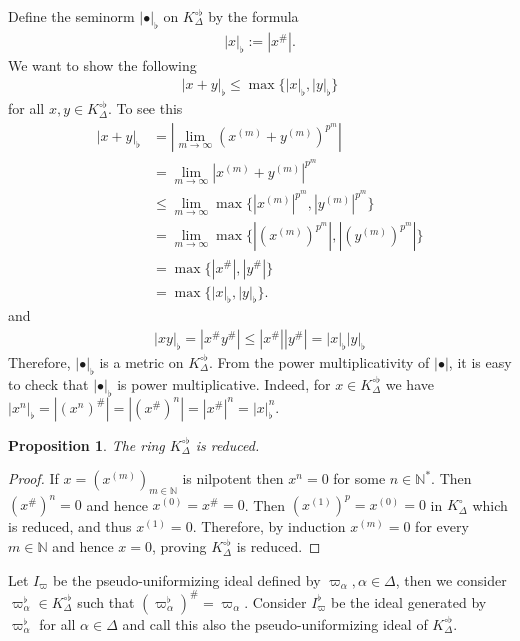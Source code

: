 \documentclass[12pts,a4paper]{amsart}
\newtheorem{proposition}{Proposition}[section]
\begin{document}
Define the seminorm $|\bullet|_\flat$ on $K^{\circ\flat}_\Delta$ by the formula
\begin{align*}
	|x|_\flat:=|x^\#|.
\end{align*}
We want to show the following
\begin{align*}
	|x+y|_\flat\leq\max\{|x|_\flat,|y|_\flat\}
\end{align*}
for all $x,y\in K^{\circ\flat}_\Delta$. To see this
\begin{align*}
	|x+y|_\flat&=|\lim\limits_{m\to\infty}(x^{(m)}+y^{(m)})^{p^m}|\\
	                &=\lim\limits_{m\to\infty}|x^{(m)}+y^{(m)}|^{p^m}\\
	                &\leq \lim\limits_{m\to \infty}\max\{|x^{(m)}|^{p^m},|y^{(m)}|^{p^m}\}\\
	                &=\lim\limits_{m\to\infty}\max\{|(x^{(m)})^{p^m}|,|(y^{(m)})^{p^m}|\}\\
	                &=\max\{|x^\#|,|y^\#|\}\\
	                &=\max\{|x|_\flat,|y|_\flat\}.
\end{align*}
and
\begin{align*}
    |xy|_\flat=|x^\#y^\#|\leq |x^\#||y^\#|=|x|_\flat|y|_\flat
\end{align*}
Therefore, $|\bullet|_\flat$ is a metric on $K^{\circ\flat}_\Delta$. From the power multiplicativity of $|\bullet|$, it is easy to check that $|\bullet|_\flat$ is power multiplicative. Indeed, for $x\in K^{\circ\flat}_\Delta$ we have $|x^n|_\flat=|(x^n)^\#|=|(x^\#)^n|=|x^\#|^n=|x|^n_\flat$.

\begin{proposition}
	The ring $K^{\circ\flat}_\Delta$ is reduced.
\end{proposition}

\begin{proof}
     If $x=(x^{(m)})_{m\in\mathbb{N}}$ is nilpotent then $x^n=0$ for some $n\in\mathbb{N}^*$. Then $(x^\#)^n=0$ and hence $x^{(0)}=x^\#=0$. Then $(x^{(1)})^p=x^{(0)}=0$ in $K^\circ_\Delta$ which is reduced, and thus $x^{(1)}=0$. Therefore, by induction $x^{(m)}=0$ for every $m\in\mathbb{N}$ and hence $x=0$, proving $K^{\circ\flat}_\Delta$ is reduced.
\end{proof}

Let $I_\varpi$ be the pseudo-uniformizing ideal defined by $\varpi_\alpha, \alpha\in\Delta$, then we consider $\varpi^\flat_\alpha\in K^{\circ\flat}_{\Delta}$ such that $(\varpi^\flat_\alpha)^\#=\varpi_\alpha$. Consider $I^\flat_\varpi$ be the ideal generated by $\varpi^\flat_\alpha$ for all $\alpha\in\Delta$ and call this also the pseudo-uniformizing ideal of $K^{\circ\flat}_\Delta$.
\end{document}
